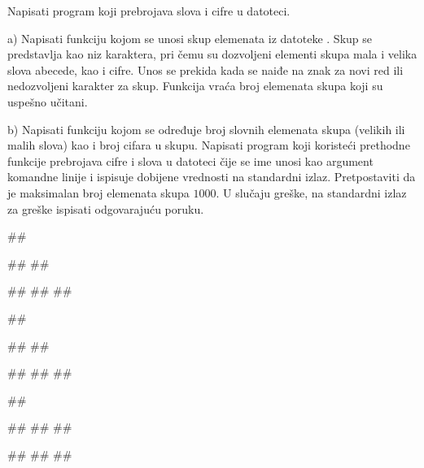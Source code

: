 \begin{Exercise}[label=p3_x4]         
Napisati program koji prebrojava slova i cifre u datoteci.
\begin{description}
\item{a)} Napisati funkciju 
  kojom se unosi skup elemenata iz datoteke . Skup se predstavlja kao
  niz karaktera, pri čemu su dozvoljeni elementi skupa mala i
  velika slova abecede, kao i cifre.  Unos se prekida kada se naiđe
  na znak za novi red ili nedozvoljeni karakter za skup.
  Funkcija vraća broj elemenata skupa koji su uspešno učitani.
\item{b)} Napisati funkciju
   kojom se
  određuje broj slovnih elemenata skupa (velikih ili malih slova)
  kao i broj cifara u skupu.
Napisati program koji koristeći prethodne funkcije prebrojava cifre i slova u datoteci 
čije se ime unosi kao argument komandne linije i ispisuje dobijene vrednosti na standardni izlaz.
Pretpostaviti da je maksimalan broj elemenata skupa $1000$.
U slučaju greške, na standardni izlaz za greške ispisati odgovarajuću poruku.
\end{description}

\begin{minitest}
\begin{upotreba}{1}
##

##
##

#\naslovIzlaz#
##
##
\end{upotreba}
\end{minitest}
\begin{minitest}
\begin{upotreba}{2}
##

##
##

#\naslovIzlaz#
##
##
\end{upotreba}
\end{minitest}
\begin{minitest}
\begin{upotreba}{3}
##

##
##
##

#\naslovIzlaz#
##
##
\end{upotreba}
\end{minitest}


\end{Exercise}
